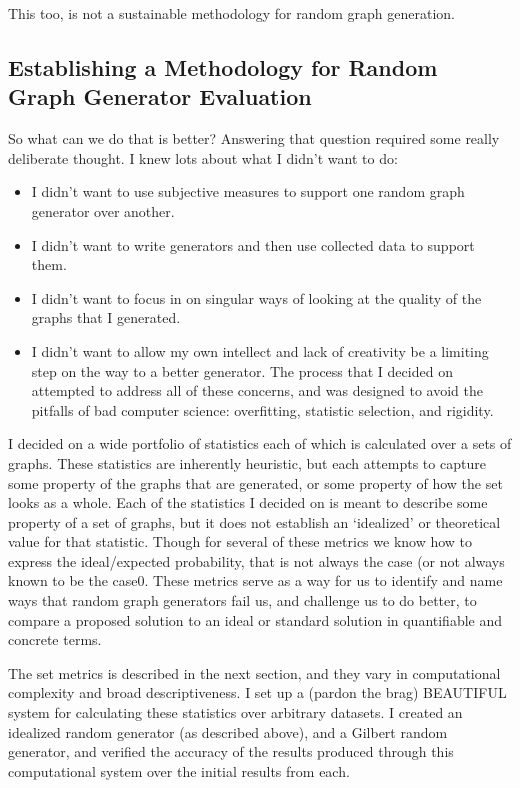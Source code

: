 This too, is not a sustainable methodology for random graph generation.

\subsection{Establishing a Methodology for Random Graph Generator Evaluation}

So what can we do that is better?
Answering that question required some really deliberate thought.
I knew lots about what I didn't want to do:
\begin{itemize}
\item{I didn't want to use subjective measures to support one random graph generator over another.}
\item{I didn't want to write generators and then use collected data to support them.}
\item{I didn't want to focus in on singular ways of looking at the quality of the graphs that I generated.}
\item{I didn't want to allow my own intellect and lack of creativity be a limiting step on the way to a better generator.}
The process that I decided on attempted to address all of these concerns, and was designed to avoid the pitfalls of bad computer science: overfitting, statistic selection, and rigidity.
\end{itemize}

I decided on a wide portfolio of statistics each of which is calculated over a sets of graphs.
These statistics are inherently heuristic, but each attempts to capture some property of the graphs that are generated, or some property of how the set looks as a whole.
Each of the statistics I decided on is meant to describe some property of a set of graphs, but it does not establish an `idealized' or theoretical value for that statistic.
Though for several of these metrics we know how to express the ideal/expected probability, that is not always the case (or not always known to be the case0.
These metrics serve as a way for us to identify and name ways that random graph generators fail us, and challenge us to do better, to compare a proposed solution to an ideal or standard solution in quantifiable and concrete terms.

The set metrics is described in the next section, and they vary in computational complexity and broad descriptiveness.
I set up a (pardon the brag) BEAUTIFUL system for calculating these statistics over arbitrary datasets.
I created an idealized random generator (as described above), and a Gilbert random generator, and verified the accuracy of the results produced through this computational system over the initial results from each.

